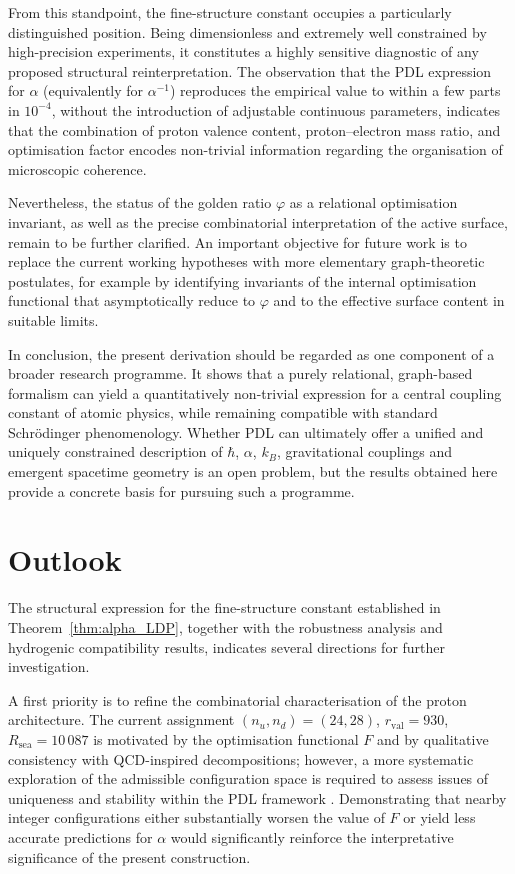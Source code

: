 \documentclass[11pt,a4paper]{article}
\theoremstyle{plain}
\theoremstyle{definition}
\theoremstyle{remark}
\begin{document}
From this standpoint, the fine-structure constant occupies a particularly distinguished position. Being dimensionless and extremely well constrained by high-precision experiments, it constitutes a highly sensitive diagnostic of any proposed structural reinterpretation. The observation that the PDL expression for \(\alpha\) (equivalently for \(\alpha^{-1}\)) reproduces the empirical value to within a few parts in \(10^{-4}\), without the introduction of adjustable continuous parameters, indicates that the combination of proton valence content, proton–electron mass ratio, and optimisation factor encodes non-trivial information regarding the organisation of microscopic coherence.

Nevertheless, the status of the golden ratio \(\varphi\) as a relational optimisation invariant, as well as the precise combinatorial interpretation of the active surface, remain to be further clarified. An important objective for future work is to replace the current working hypotheses with more elementary graph-theoretic postulates, for example by identifying invariants of the internal optimisation functional that asymptotically reduce to \(\varphi\) and to the effective surface content in suitable limits.

In conclusion, the present derivation should be regarded as one component of a broader research programme. It shows that a purely relational, graph-based formalism can yield a quantitatively non-trivial expression for a central coupling constant of atomic physics, while remaining compatible with standard Schrödinger phenomenology. Whether PDL can ultimately offer a unified and uniquely constrained description of \(\hbar\), \(\alpha\), \(k_B\), gravitational couplings and emergent spacetime geometry is an open problem, but the results obtained here provide a concrete basis for pursuing such a programme.

\section{Outlook}

The structural expression for the fine-structure constant established in Theorem~\ref{thm:alpha_LDP}, together with the robustness analysis and hydrogenic compatibility results, indicates several directions for further investigation.

A first priority is to refine the combinatorial characterisation of the proton architecture. The current assignment \((n_u,n_d) = (24,28)\), \(r_{\mathrm{val}} = 930\), \(R_{\mathrm{sea}} = 10\,087\) is motivated by the optimisation functional \(F\) and by qualitative consistency with QCD-inspired decompositions; however, a more systematic exploration of the admissible configuration space is required to assess issues of uniqueness and stability within the PDL framework \cite{Laubscher2026PDL_English,Laubscher2026LDP_French}. Demonstrating that nearby integer configurations either substantially worsen the value of \(F\) or yield less accurate predictions for \(\alpha\) would significantly reinforce the interpretative significance of the present construction.
\end{document}
